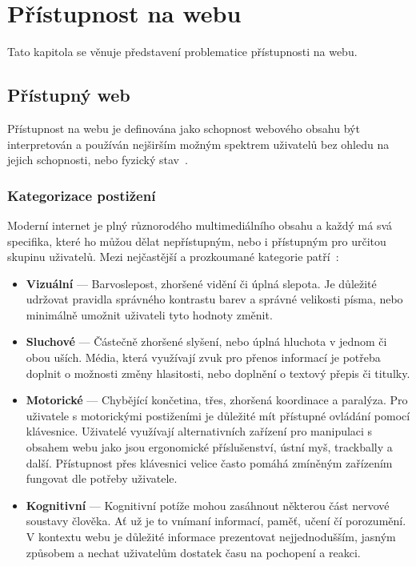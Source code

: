 \chapter{Přístupnost na webu}

Tato kapitola se věnuje představení problematice přístupnosti na webu.

\section{Přístupný web}

Přístupnost na webu je definována jako schopnost webového obsahu být interpretován a používán nejširším možným spektrem uživatelů bez ohledu na jejich schopnosti, nebo fyzický stav~\cite{w3-accessibility}.

\subsection{Kategorizace postižení}

Moderní internet je plný různorodého multimediálního obsahu a každý má svá specifika, které ho můžou dělat nepřístupným, nebo i přístupným pro určitou skupinu uživatelů.
Mezi nejčastější a prozkoumané kategorie patří~\cite{w3-disabilities}:

\begin{itemize}
  \item \textbf{Vizuální} --- Barvoslepost, zhoršené vidění či úplná slepota.
        Je důležité udržovat pravidla správného kontrastu barev a správné velikosti písma, nebo minimálně umožnit uživateli tyto hodnoty změnit.
  \item \textbf{Sluchové} --- Částečně zhoršené slyšení, nebo úplná hluchota v jednom či obou uších.
        Média, která využívají zvuk pro přenos informací je potřeba doplnit o možnosti změny hlasitosti, nebo doplnění o textový přepis či titulky.
  \item \textbf{Motorické} --- Chybějící končetina, třes, zhoršená koordinace a paralýza.
        Pro uživatele s motorickými postiženími je důležité mít přístupné ovládání pomocí klávesnice.
        Uživatelé využívají alternativních zařízení pro manipulaci s obsahem webu jako jsou ergonomické příslušenství, ústní myš, trackbally a další.
        Přístupnost přes klávesnici velice často pomáhá zmíněným zařízením fungovat dle potřeby uživatele.
  \item \textbf{Kognitivní} --- Kognitivní potíže mohou zasáhnout některou část nervové soustavy člověka.
        Ať už je to vnímaní informací, paměť, učení čí porozumění.
        V kontextu webu je důležité informace prezentovat nejjednodušším, jasným způsobem a nechat uživatelům dostatek času na pochopení a reakci.
\end{itemize}


